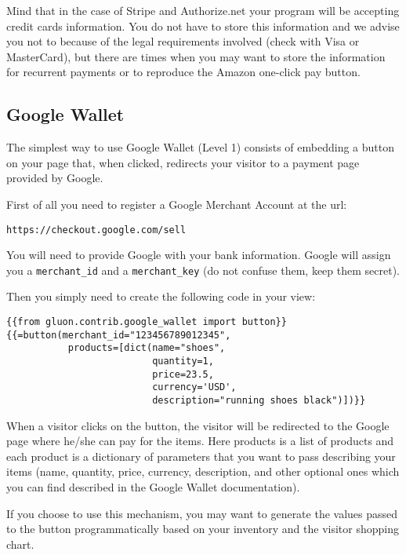 \documentclass[justified,sixbynine,notoc]{tufte-book}
\def\ft{\small\tt}
\begin{document}
\begin{fullwidth}
Mind that in the case of Stripe and Authorize.net your program will be accepting credit cards information. You do not have to store this information and we advise you not to because of the legal requirements involved (check with Visa or MasterCard), but there are times when you may want to store the information for recurrent payments or to reproduce the Amazon one-click pay button.

\goodbreak\subsection{Google Wallet}

The simplest way to use Google Wallet (Level 1) consists of embedding a button on your page that, when clicked, redirects your visitor to a payment page provided by Google.

First of all you need to register a Google Merchant Account at the url:

\begin{lstlisting}[keywords={}]
https://checkout.google.com/sell
\end{lstlisting}

You will need to provide Google with your bank information. Google will assign you a {\ft merchant\_id} and a {\ft merchant\_key} (do not confuse them, keep them secret).

Then you simply need to create the following code in your view:

\begin{lstlisting}[keywords={}]
{{from gluon.contrib.google_wallet import button}}
{{=button(merchant_id="123456789012345",
           products=[dict(name="shoes",
                          quantity=1,
                          price=23.5,
                          currency='USD',
                          description="running shoes black")])}}
\end{lstlisting}

When a visitor clicks on the button, the visitor will be redirected to the Google page where he/she can pay for the items. Here products is a list of products and each product is a dictionary of parameters that you want to pass describing your items (name, quantity, price, currency, description, and other optional ones which you can find described in the Google Wallet documentation).

If you choose to use this mechanism, you may want to generate the values passed to the button programmatically based on your inventory and the visitor shopping chart.


\end{fullwidth}
\end{document}
